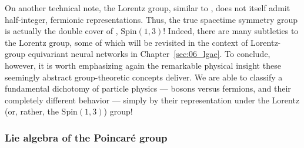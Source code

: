 On another technical note, the Lorentz group, similar to \SO[3], does not itself admit half-integer, fermionic representations.
Thus, the true spacetime symmetry group is actually the double cover of \SO[1, 3], $\mathrm{Spin}(1,3)$!
Indeed, there are many subtleties to the Lorentz group, some of which will be revisited in the context of Lorentz-group equivariant neural networks in Chapter~\ref{sec:06_lgae}.
To conclude, however, it is worth emphasizing again the remarkable physical insight these seemingly abstract group-theoretic concepts deliver.
We are able to classify a fundamental dichotomy of particle physics --- bosons versus fermions, and their completely different behavior --- simply by their representation under the Lorentz (or, rather, the $\mathrm{Spin}(1,3)$) group!

\begin{table}[ht!]
	\centering
	\renewcommand{\arraystretch}{1.5}
	\vspace{1em}
	\caption{Representations of the Lorentz group and their associated particle fields in the SM.}
	\label{tab:01_lorentz_representations}
\end{table}


\subsubsection{Lie algebra of the Poincaré group}

